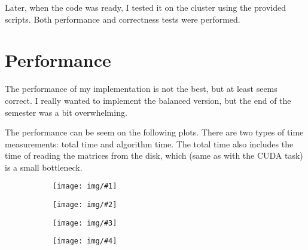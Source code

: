 \documentclass[a4paper,12pt]{article}
\newcommand{\plottimes}[4]{
    \begin{figure}
        \begin{subfigure}{.5\textwidth}
            \centering
            \texttt{[image: img/\#1]}
        \end{subfigure}%
        \begin{subfigure}{.5\textwidth}
            \centering
            \texttt{[image: img/\#2]}
        \end{subfigure}
        \begin{subfigure}{.5\textwidth}
            \centering
            \texttt{[image: img/\#3]}
        \end{subfigure}%
        \begin{subfigure}{.5\textwidth}
            \centering
            \texttt{[image: img/\#4]}
        \end{subfigure}
    \end{figure}
}
\begin{document}
    Later, when the code was ready, I tested it on the cluster using
    the provided scripts. Both performance and correctness tests were
    performed.

    \section{ Performance }

    The performance of my implementation is not the best, but
    at least seems correct. I really wanted to implement the balanced
    version, but the end of the semester was a bit overwhelming.

    The performance can be seem on the following plots. There are two types
    of time measurements: total time and algorithm time.
    The total time also includes the time of reading the matrices from the disk,
    which (same as with the CUDA task) is a small bottleneck.

    \plottimes
        {algorithm-time-ms_speedup_medium}
        {algorithm-time-ms_speedup_large}
        {total-time-ms_speedup_medium}
        {total-time-ms_speedup_large}
\end{document}
